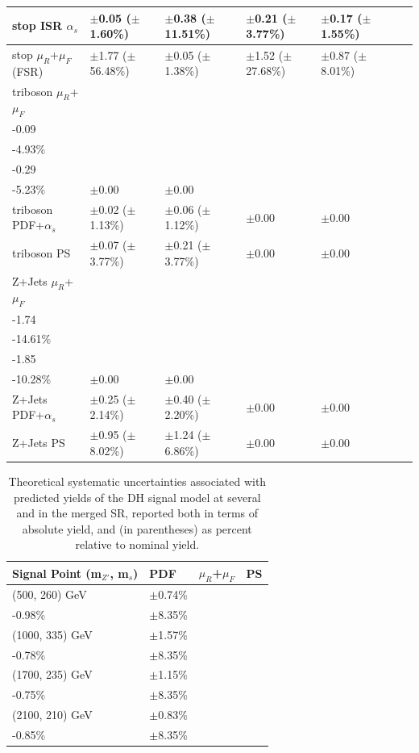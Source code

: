 \begin{table}[ht]
{\begin{tabular}{l l l l l l l }
\midrule
stop ISR \(\alpha_s\) & \(\pm\)0.05 (\(\pm\)1.60\%) &\(\pm\)0.38 (\(\pm\)11.51\%) &\(\pm\)0.21 (\(\pm\)3.77\%) &\(\pm\)0.17 (\(\pm\)1.55\%) \tabularnewline
\midrule
stop \(\mu_R\)+\(\mu_F\) (FSR) & \(\pm\)1.77 (\(\pm\)56.48\%) &\(\pm\)0.05 (\(\pm\)1.38\%) &\(\pm\)1.52 (\(\pm\)27.68\%) &\(\pm\)0.87 (\(\pm\)8.01\%) \tabularnewline
\midrule
triboson \(\mu_R\)+\(\mu_F\) & \(\substack{+0.11\\-0.09}\) \big(\(\substack{+5.78\%\\-4.93\%}\)\big) & \(\substack{+0.34\\-0.29}\) \big(\(\substack{+6.10\%\\-5.23\%}\)\big) & \(\pm0.00\) & \(\pm0.00\) \tabularnewline
\midrule
triboson PDF+\(\alpha_s\) & \(\pm\)0.02 (\(\pm\)1.13\%) &\(\pm\)0.06 (\(\pm\)1.12\%) &\(\pm\)0.00  &\(\pm0.00\) \tabularnewline
\midrule
triboson PS & \(\pm\)0.07 (\(\pm\)3.77\%) &\(\pm\)0.21 (\(\pm\)3.77\%) &\(\pm\)0.00 &\(\pm\)0.00 \tabularnewline
\midrule
Z+Jets \(\mu_R\)+\(\mu_F\) & \(\substack{+2.95\\-1.74}\) \big(\(\substack{+24.86\%\\-14.61\%}\)\big) & \(\substack{+1.10\\-1.85}\) \big(\(\substack{+6.08\%\\-10.28\%}\)\big) & \(\pm0.00\) & \(\pm0.00\) \tabularnewline
\midrule
Z+Jets PDF+\(\alpha_s\) & \(\pm\)0.25 (\(\pm\)2.14\%) &\(\pm\)0.40 (\(\pm\)2.20\%) &\(\pm0.00\) & \(\pm0.00\) \tabularnewline
\midrule
Z+Jets PS & \(\pm\)0.95 (\(\pm\)8.02\%) &\(\pm\)1.24 (\(\pm\)6.86\%) & \(\pm0.00\) & \(\pm0.00\) \tabularnewline
\bottomrule
\end{tabular}}
\end{table}


\begin{table}[ht]
\begin{center}\small{
\caption{\label{tab:systs_sig_SR_mgd} Theoretical systematic uncertainties associated with predicted yields of the DH signal model at several \ms and \mZp in the merged SR, reported both in terms of absolute yield, and (in parentheses) as percent relative to nominal yield.}
\begin{tabular}{l l l l }
\toprule
\textbf{Signal Point (m\({_{Z'}}\), m\(_s\))} &\textbf{PDF} &\textbf{\(\mu_R\)+\(\mu_F\)} &\textbf{PS}\tabularnewline
\midrule
\midrule
(500, 260) GeV & \(\pm\)0.74\% & \(\substack{+0.95\%\\-0.98\%}\) & \(\pm\)8.35\% \tabularnewline
\midrule
(1000, 335) GeV & \(\pm\)1.57\% & \(\substack{+0.80\%\\-0.78\%}\) & \(\pm\)8.35\% \tabularnewline
\midrule
(1700, 235) GeV & \(\pm\)1.15\% & \(\substack{+0.71\%\\-0.75\%}\) & \(\pm\)8.35\% \tabularnewline
\midrule
(2100, 210) GeV & \(\pm\)0.83\% & \(\substack{+0.78\%\\-0.85\%}\) & \(\pm\)8.35\% \tabularnewline
\bottomrule
\end{tabular}
}
\end{center}
\end{table}

